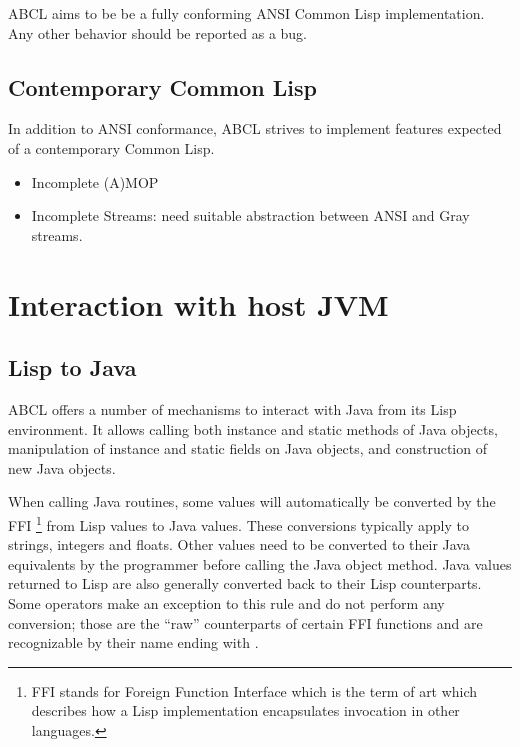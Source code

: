 \documentclass[10pt]{book}
\begin{document}
ABCL aims to be be a fully conforming ANSI Common Lisp
implementation.  Any other behavior should be reported as a bug.

\section{Contemporary Common Lisp}
In addition to ANSI conformance, \textsc{ABCL} strives to implement features
expected of a contemporary Common Lisp.
\begin{itemize}
  \item Incomplete (A)MOP 
  \item Incomplete Streams:  need suitable abstraction between ANSI
    and Gray streams.
    
\end{itemize}

\chapter{Interaction with host JVM}


\section{Lisp to Java}

\textsc{ABCL} offers a number of mechanisms to interact with Java from its
Lisp environment. It allows calling both instance and static methods
of Java objects, manipulation of instance and static fields on Java
objects, and construction of new Java objects.

When calling Java routines, some values will automatically be
converted by the FFI \footnote{FFI stands for Foreign Function
  Interface which is the term of art which describes how a Lisp
  implementation encapsulates invocation in other languages.}  from
Lisp values to Java values. These conversions typically apply to
strings, integers and floats. Other values need to be converted to
their Java equivalents by the programmer before calling the Java
object method. Java values returned to Lisp are also generally
converted back to their Lisp counterparts. Some operators make an
exception to this rule and do not perform any conversion; those are
the ``raw'' counterparts of certain FFI functions and are recognizable
by their name ending with .
\end{document}
